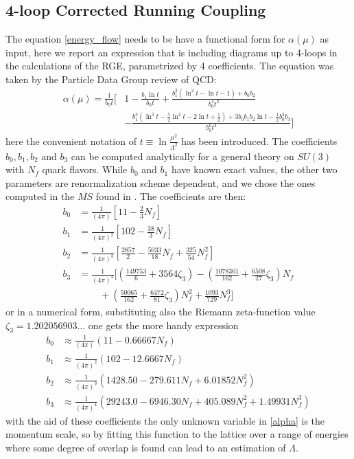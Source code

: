 \subsection{4-loop Corrected Running Coupling}
\label{sec:4loop}
The equation \cref{energy_flow} needs to be have a functional form for $\alpha(\mu)$ as input, here we report an expression that is including diagrams up to 4-loops in the calculations of the RGE, parametrized by 4 coefficients. The equation was taken by the Particle Data Group review of QCD\cite{dissertori_9._2016-1}:
\begin{align}
    \alpha(\mu) = \frac{1}{b_0t} \bigg[& 1 - \frac{b_1\ln t}{b_0t}  + \frac{b_1^2(\ln^2t - \ln t - 1) + b_0b_2}{b_0^4t^2}\\\nonumber
    & - \frac{b_1^3(\ln^3t - \frac{5}{2}\ln^2 t - 2\ln t + \frac{1}{2}) + 3b_0b_1b_2\ln t - \frac{1}{2}b_0^2b_3}{b_0^6t^3}\bigg]
    \label{alpha}
\end{align}
here the convenient notation of $t\equiv\ln\frac{\mu^2}{\Lambda^2}$ has been introduced. The coefficients $b_0, b_1,b_2$ and $b_3$ can be computed analytically for a general theory on $SU(3)$ with $N_f$ quark flavors. While $b_0$ and $b_1$ have known exact values, the other two parameters are renormalization scheme dependent, and we chose the ones computed in the $\overline{MS}$ found in \cite{van_ritbergen_four-loop_1997}. The coefficients are then: 
\begin{align}
    b_0 &= \frac{1}{(4\pi)}   \left[11 - \frac{2}{3}N_f\right] \\\nonumber
    b_1 &= \frac{1}{(4\pi)^2} \left[102 - \frac{38}{3}N_f\right] \\\nonumber
    b_2 &= \frac{1}{(4\pi)^3} \left[\frac{2857}{2} - \frac{5033}{18}N_f + \frac{325}{54}N_f^2\right] \\\nonumber
    b_3 &= \frac{1}{(4\pi)^4} \bigg[\left(\frac{149753}{6} + 3564\zeta_3\right)  - \left(\frac{1078361}{162}+ \frac{6508}{27}\zeta_3\right) N_f  \\\nonumber
    & ~~~~~~~~~~+ \left(\frac{50065}{162}  + \frac{6472}{81}\zeta_3\right)N_f^2 + \frac{1093}{729}N_f^3 \bigg] 
\end{align} 
or in a numerical form, substituting also the Riemann zeta-function value $\zeta_3 = 1.202056903\dots$ one gets the more handy expression
\begin{align}
    \label{b:coeffs}
    b_0 &\approx \frac{1}{(4\pi)} (11-0.66667N_f)\\\nonumber
    b_1 &\approx \frac{1}{(4\pi)^2} (102-12.6667N_f)\\\nonumber
    b_2 &\approx \frac{1}{(4\pi)^3} (1428.50-279.611N_f+ 6.01852N_f^2)\\\nonumber
    b_3 &\approx \frac{1}{(4\pi)^4} (29243.0-6946.30N_f+ 405.089N_f^2+ 1.49931N_f^3)
\end{align}
with the aid of these coefficients the only unknown variable in \cref{alpha} is the momentum scale, so by fitting this function to the lattice over a range of energies where some degree of overlap is found can lead to an estimation of $\Lambda$. 